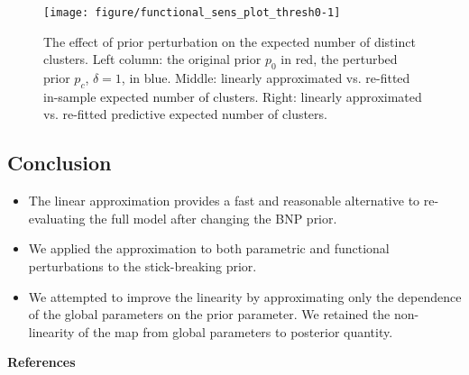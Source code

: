 \documentclass[a0,plainsections,30pt]{sciposter}\usepackage[]{graphicx}\usepackage[]{color}
\newenvironment{knitrout}{}{} %
\begin{document}
\begin{minipage}[t]{0.45\textwidth}
\begin{figure}
\begin{knitrout}
\color{fgcolor}

{\centering \texttt{[image: figure/functional\_sens\_plot\_thresh0-1]} 

}



\end{knitrout}
\caption{The effect of prior perturbation on the expected number of distinct clusters. Left column: the original prior $p_0$ in red, the perturbed prior $p_c$, $\delta = 1$, in blue. Middle: linearly approximated vs.
re-fitted in-sample expected number of clusters. Right: linearly approximated vs. re-fitted predictive expected number of clusters.}
\end{figure}

\begin{mdframed}[style=MyFrame]
\vspace{-0.6in}
\section*{Conclusion}
\vspace{-0.3in}

\begin{itemize}

\item The linear approximation provides a fast and reasonable alternative to re-evaluating the full model after changing the BNP prior. 

\item We applied the approximation to both parametric and functional perturbations to the stick-breaking prior.

\item We attempted to improve the linearity by approximating only the dependence of the global parameters on the prior parameter. We retained the non-linearity of the map from global parameters to posterior quantity. 

\end{itemize}
\end{mdframed}

{\bf References}
\renewcommand{\section}[2]{}%
\footnotesize{
  
  
}
\end{minipage}\\
\end{document}
